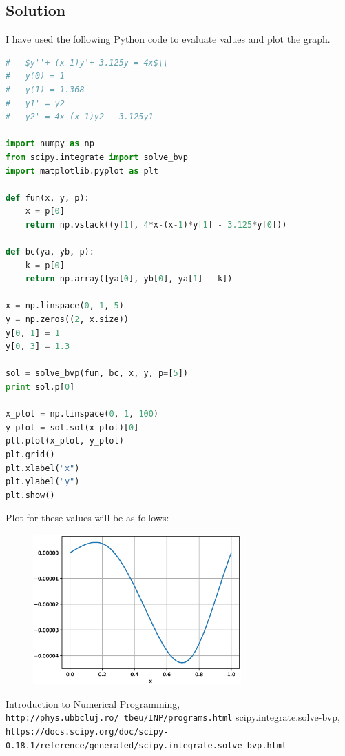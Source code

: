 \documentclass[a4paper,10pt]{article}
\begin{document}
\subsection{Solution}
I have used the following Python code \cite{bvp} to evaluate values and plot the graph.
\begin{lstlisting}[language=Python]
#	$y''+ (x-1)y'+ 3.125y = 4x$\\
#	y(0) = 1
#	y(1) = 1.368
#	y1' = y2
#	y2' = 4x-(x-1)y2 - 3.125y1

import numpy as np
from scipy.integrate import solve_bvp
import matplotlib.pyplot as plt

def fun(x, y, p):
	x = p[0]
	return np.vstack((y[1], 4*x-(x-1)*y[1] - 3.125*y[0]))

def bc(ya, yb, p):
	k = p[0]
	return np.array([ya[0], yb[0], ya[1] - k])

x = np.linspace(0, 1, 5)
y = np.zeros((2, x.size))
y[0, 1] = 1
y[0, 3] = 1.3

sol = solve_bvp(fun, bc, x, y, p=[5])
print sol.p[0]

x_plot = np.linspace(0, 1, 100)
y_plot = sol.sol(x_plot)[0]
plt.plot(x_plot, y_plot)
plt.grid()
plt.xlabel("x")
plt.ylabel("y")
plt.show()
\end{lstlisting}
Plot for these values will be as follows:
\begin{figure}[ht]
\includegraphics[width=8cm]{1_2.eps}
\end{figure}
\medskip

\begin{thebibliography}{9}
 Introduction to Numerical Programming, \\\texttt{http://phys.ubbcluj.ro/~tbeu/INP/programs.html}
 scipy.integrate.solve-bvp, \\\texttt{https://docs.scipy.org/doc/scipy-0.18.1/reference/generated/scipy.integrate.solve-bvp.html}

\end{thebibliography}
\end{document}
